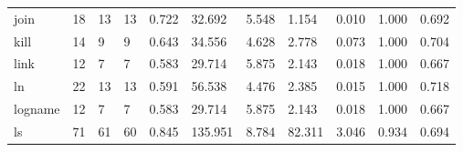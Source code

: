 \begin{longtable}{lp{1.8cm}p{1.8cm}p{1.8cm}p{1.8cm}p{1.8cm}p{1.8cm}p{1.8cm}p{1.8cm}p{1.8cm}p{1.8cm}}
join      &                           18 &                 13 &                                13 &                                      0.722 &                                 32.692 &                                        5.548 &                             1.154 &                                   0.010 &                              1.000 &                                              0.692 \\
kill      &                           14 &                  9 &                                 9 &                                      0.643 &                                 34.556 &                                        4.628 &                             2.778 &                                   0.073 &                              1.000 &                                              0.704 \\
link      &                           12 &                  7 &                                 7 &                                      0.583 &                                 29.714 &                                        5.875 &                             2.143 &                                   0.018 &                              1.000 &                                              0.667 \\
ln        &                           22 &                 13 &                                13 &                                      0.591 &                                 56.538 &                                        4.476 &                             2.385 &                                   0.015 &                              1.000 &                                              0.718 \\
logname   &                           12 &                  7 &                                 7 &                                      0.583 &                                 29.714 &                                        5.875 &                             2.143 &                                   0.018 &                              1.000 &                                              0.667 \\
ls        &                           71 &                 61 &                                60 &                                      0.845 &                                135.951 &                                        8.784 &                            82.311 &                                   3.046 &                              0.934 &                                              0.694 \\

\end{longtable}

